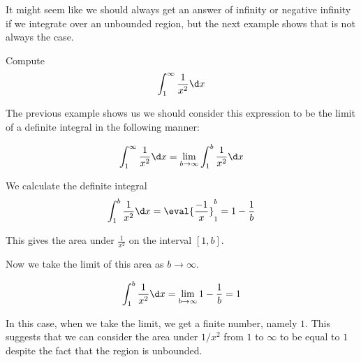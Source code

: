 \documentclass{ximera}
\begin{document}
It might seem like we should always get an answer of infinity or negative infinity if we integrate over an unbounded region, but the next example shows that is not always the case.

\begin{example}
Compute 
\[
\int_{1}^{\infty} \frac{1}{x^2} \d x
\]

\begin{explanation}
The previous example shows us we should consider this expression to be the limit of a definite integral 
in the following manner:

\[
\int_{1}^{\infty} \frac{1}{x^2} \d x=\lim_{b \to \infty} \int_{1}^{b} \frac{1}{x^2} \d x
\]

We calculate the definite integral 
\[
\int_{1}^{b} \frac{1}{x^2} \d x= \eval{\frac{-1}{x}}_{1}^{b}=1-\frac{1}{b}
\]

This gives the area under $\frac{1}{x^2}$ on the interval $[1, b]$. 

\begin{image}
\end{image}

Now we take the limit of this area as $b \to \infty$. 

\[
\int_{1}^{b} \frac{1}{x^2} \d x= \lim_{b \to \infty} 1-\frac{1}{b}=1
\]
  
In this case, when we take the limit, we get a finite number, namely $1$. This suggests that we can consider the 
area under $1/x^2$ from $1$ to $\infty$ to be equal to $1$ despite the fact that the region is unbounded. 



\end{explanation}
\end{example}
\end{document}
